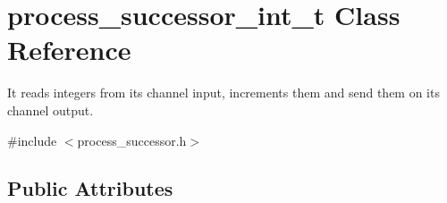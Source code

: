 \hypertarget{structprocess__successor__int__t}{}\section{process\+\_\+successor\+\_\+int\+\_\+t Class Reference}
\label{structprocess__successor__int__t}


It reads integers from its channel input, increments them and send them on its channel output.  




{\ttfamily \#include $<$process\+\_\+successor.\+h$>$}

\subsection*{Public Attributes}
